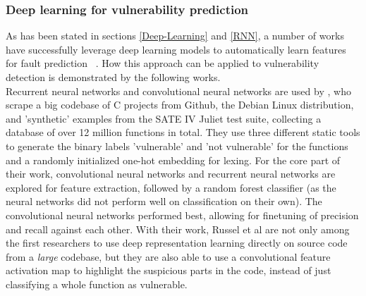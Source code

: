 \documentclass[
a4paper,
pagesize,
pdftex,
12pt,
twoside, %
BCOR=5mm, %
ngerman,
fleqn,
final,
]{scrartcl}
\begin{document}
	\subsubsection{Deep learning for vulnerability prediction}\label{deep-vulnerability-prediction}
	As has been stated in sections \ref{Deep-Learning} and \ref{RNN}, a number of works have successfully leverage deep learning models to automatically learn features for fault prediction ~\cite{IEEE.2015b,IEEE.2016,Wang.2016}. How this approach can be applied to vulnerability detection is demonstrated by the following works.\\
	Recurrent neural networks and convolutional neural networks are used by \cite{Russell.2018}, who scrape a big codebase of C projects from Github, the Debian Linux distribution, and 'synthetic' examples from the SATE IV Juliet test suite, collecting a database of over 12 million functions in total. They use three different static tools to generate the binary labels 'vulnerable' and 'not vulnerable' for the functions and a randomly initialized one-hot embedding for lexing. For the core part of their work, convolutional neural networks and recurrent neural networks are explored for feature extraction, followed by a random forest classifier (as the neural networks did not perform well on classification on their own). The convolutional neural networks performed best, allowing for finetuning of precision and recall against each other. With their work, Russel et al are not only among the first researchers to use deep representation learning directly on source code from a \textit{large} codebase, but they are also able to use a convolutional feature activation map to highlight the suspicious parts in the code, instead of just classifying a whole function as vulnerable.\\
\end{document}
